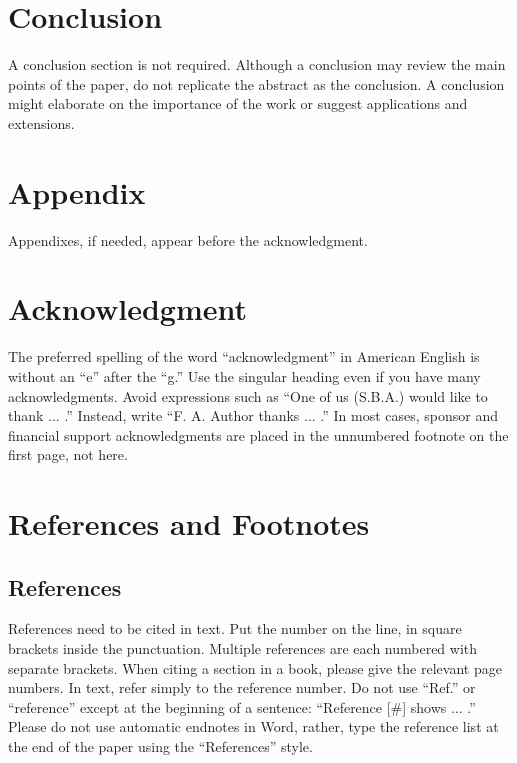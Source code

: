 \documentclass[journal]{IEEEtranTIE}
\begin{document}
\section{Conclusion}

A conclusion section is not required. Although a conclusion may review the main points of the paper, do not replicate the abstract as the conclusion. A conclusion might elaborate on the importance of the work or suggest applications and extensions.


\section*{Appendix}

Appendixes, if needed, appear before the acknowledgment.

\section*{Acknowledgment}

The preferred spelling of the word ``acknowledgment'' in American English is without an ``e'' after the ``g.'' Use the singular heading even if you have many acknowledgments. Avoid expressions such as ``One of us (S.B.A.) would like to thank ... .'' Instead, write ``F. A. Author thanks ... .'' In most cases, sponsor and financial support acknowledgments are placed in the unnumbered footnote on the first page, not here.

\section*{References and Footnotes}

\subsection{References}
References need to be cited in text. Put the number on the line, in square brackets inside the punctuation.  Multiple references are each numbered with separate brackets. When citing a section in a book, please give the relevant page numbers. In text, refer simply to the reference number. Do not use ``Ref.'' or ``reference'' except at the beginning of a sentence: ``Reference [\#] shows ... .'' Please do not use automatic endnotes in Word, rather, type the reference list at the end of the paper using the ``References'' style.
\end{document}
